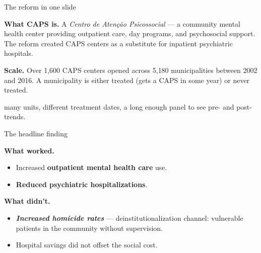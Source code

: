 \documentclass[aspectratio=169,12pt,t]{beamer}
\begin{document}
\begin{frame}{The reform in one slide}
\vspace{0.5cm}

\textbf{What CAPS is.} \;A \textit{Centro de Aten\c{c}\~ao Psicossocial} --- a community mental health center providing outpatient care, day programs, and psychosocial support. \;The reform created CAPS centers as a substitute for inpatient psychiatric hospitals.

\vspace{0.5cm}

\textbf{Scale.} \;Over 1{,}600 CAPS centers opened across 5{,}180 municipalities between 2002 and 2016. \;A municipality is either treated (gets a CAPS in some year) or never treated.

\vspace{0.5cm}

 \;many units, different treatment dates, a long enough panel to see pre- and post-trends.
\end{frame}

\begin{frame}{The headline finding}
\vspace{0.3cm}

\textbf{What worked.}
\begin{itemize}\small\setlength\itemsep{0pt}
  \item Increased \textbf{outpatient mental health care} use.
  \item \textbf{Reduced psychiatric hospitalizations}.
\end{itemize}

\vspace{0.3cm}

\textbf{What didn't.}
\begin{itemize}\small\setlength\itemsep{0pt}
  \item \textit{\textbf{Increased homicide rates}} --- deinstitutionalization channel: vulnerable patients in the community without supervision.
  \item Hospital savings did not offset the social cost.
\end{itemize}

\vspace{0.2cm}
\end{frame}
\end{document}
